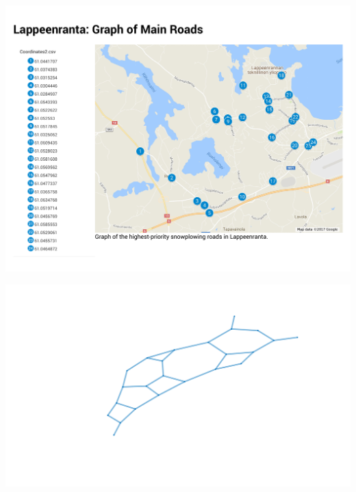 \documentclass[hyperref={pdfpagelabels=false}, xcolor=x11names,compress]{beamer}
\newcommand{\<}[1]{\begin{column}{#1}}
\renewcommand{\>}{\end{column}}
\begin{document}
\begin{frame}
\includegraphics[width = \textwidth]{Map_of_Graph.pdf}
\end{frame}

\begin{frame}
\includegraphics[width = \textwidth]{Lappeenranta_Graph.pdf}
\end{frame}
\end{document}
